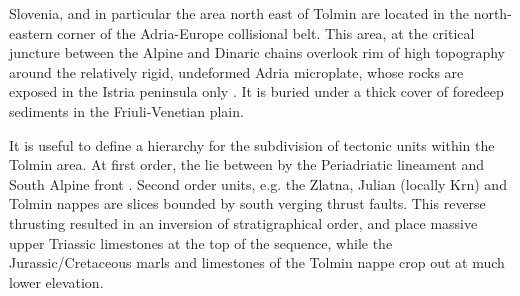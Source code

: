 Slovenia, and in particular the area north east of Tolmin are located in the north-eastern corner of the Adria-Europe collisional belt. 
This area, at the critical juncture between the Alpine and Dinaric chains overlook rim of high topography around the relatively rigid, undeformed Adria microplate, whose rocks are  exposed in the Istria peninsula only \citep{vsmuc2009tectonic}. 
It is buried under a thick cover of foredeep sediments in the Friuli-Venetian plain. 

It is useful to define a hierarchy for the subdivision of tectonic units within the Tolmin area. 
At first order, the  lie between by the Periadriatic lineament and South Alpine front \citep{placer1998contribution}. 
Second order units, e.g. the Zlatna, Julian (locally Krn) and Tolmin nappes are slices bounded by south verging thrust faults. 
This reverse thrusting resulted in an inversion of stratigraphical order, and place massive upper Triassic limestones at the top of the sequence, while the Jurassic/Cretaceous marls and limestones of the Tolmin nappe crop out at much lower elevation.

